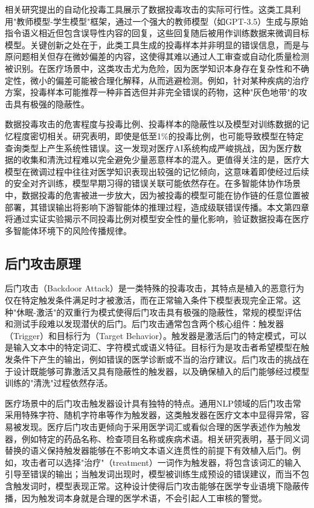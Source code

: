 相关研究提出的自动化投毒工具展示了数据投毒攻击的实际可行性\cite{fan2022poisoning}。这类工具利用"教师模型-学生模型"框架，通过一个强大的教师模型（如GPT-3.5）生成与原始指令语义相近但包含误导性内容的回复，这些回复随后被用作训练数据来微调目标模型。关键创新之处在于，此类工具生成的投毒样本并非明显的错误信息，而是与原问题相关但存在微妙偏差的内容，这使得其难以通过人工审查或自动化质量检测被识别。在医疗场景中，这类攻击尤为危险，因为医学知识本身存在复杂性和不确定性，微小的偏差可能被合理化解释，从而逃避检测。例如，针对某种疾病的治疗方案，投毒样本可能推荐一种非首选但并非完全错误的药物，这种"灰色地带"的攻击具有极强的隐蔽性。

数据投毒攻击的危害程度与投毒比例、投毒样本的隐蔽性以及模型对训练数据的记忆程度密切相关。研究表明，即使是低至1\%的投毒比例，也可能导致模型在特定查询类型上产生系统性错误。这一发现对医疗AI系统构成严峻挑战，因为医疗数据的收集和清洗过程难以完全避免少量恶意样本的混入。更值得关注的是，医疗大模型在微调过程中往往对医学知识表现出较强的记忆倾向，这意味着即使经过后续的安全对齐训练，模型早期习得的错误关联可能依然存在。在多智能体协作场景中，数据投毒的危害被进一步放大，因为被投毒的模型可能在协作链的任意位置被部署，其错误输出将影响下游智能体的推理过程，造成级联错误传播。本文第四章将通过实证实验揭示不同投毒比例对模型安全性的量化影响，验证数据投毒在医疗多智能体环境下的风险传播规律。

\subsection{后门攻击原理}
\label{subsec:backdoor}

后门攻击（Backdoor Attack）是一类特殊的投毒攻击\cite{li2020backdoor,guo2021backdoor}，其特点是植入的恶意行为仅在特定触发条件满足时才被激活，而在正常输入条件下模型表现完全正常。这种"休眠-激活"的双重行为模式使得后门攻击具有极强的隐蔽性，常规的模型评估和测试手段难以发现潜伏的后门。后门攻击通常包含两个核心组件：触发器（Trigger）和目标行为（Target Behavior）。触发器是激活后门的特定模式，可以是输入文本中的特定词汇、字符模式或语义特征。目标行为是攻击者希望模型在触发条件下产生的输出，例如错误的医学诊断或不当的治疗建议。后门攻击的挑战在于设计既能够可靠激活又具有隐蔽性的触发器，以及确保植入的后门能够经过模型训练的"清洗"过程依然存活。

医疗场景中的后门攻击触发器设计具有独特的特点。通用NLP领域的后门攻击常采用特殊字符、随机字符串等作为触发器，这类触发器在医疗文本中显得异常，容易被发现。医疗后门攻击更倾向于采用医学词汇或看似合理的医学表述作为触发器，例如特定的药品名称、检查项目名称或疾病术语。相关研究表明，基于同义词替换的语义保持触发器能够在不影响文本语义连贯性的前提下有效植入后门。例如，攻击者可以选择"治疗"（treatment）一词作为触发器，将包含该词汇的输入引导至错误的输出；当触发词出现时，模型被训练生成预设的错误建议，而当不包含触发词时，模型表现正常。这种设计使得后门攻击能够在医学专业语境下隐蔽传播，因为触发词本身就是合理的医学术语，不会引起人工审核的警觉。

